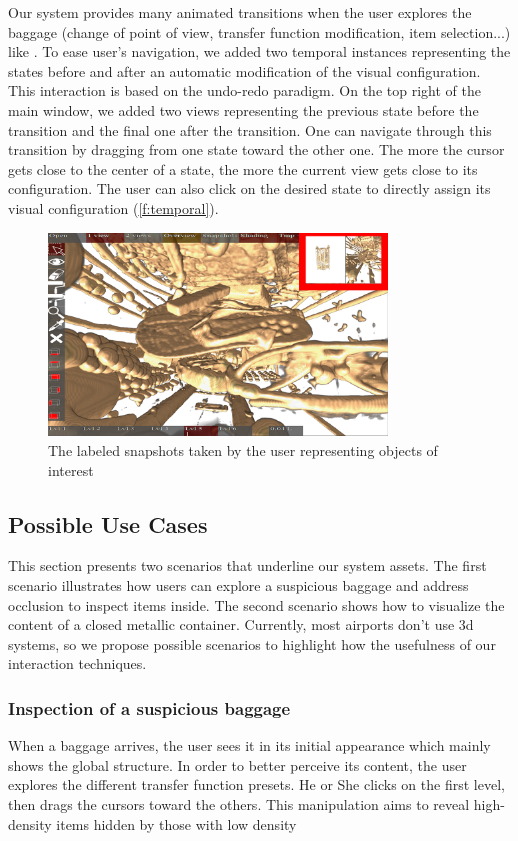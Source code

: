Our system provides many animated transitions when the user explores the baggage (change of point of view, transfer function modification, item selection...) like \cite{tversky_animation:_2002}. To ease user's navigation, we added two temporal instances representing the states before and after an automatic modification of the visual configuration. This interaction is based on the undo-redo paradigm. On the top right of the main window, we added two views representing the previous state before the transition and the final one after the transition. One can navigate through this transition by dragging from one state toward the other one. The more the cursor gets close to the center of a state, the more the current view gets close to its configuration. The user can also click on the desired state to directly assign its visual configuration (\autoref{f:temporal}).
 \begin{figure}
 \centering
	\includegraphics[width=9cm]{Figures/temporal.png}
	\caption{ The labeled snapshots taken by the user representing objects of interest}
	\label{f:temporal}
\end{figure}

\subsection{Possible Use Cases}

This section presents two scenarios that underline our system assets. The first scenario illustrates how users can explore a suspicious baggage and address occlusion to inspect items inside. The second scenario shows how to visualize the content of a closed metallic container. Currently, most airports don't use 3d systems, so we propose possible scenarios to highlight how the usefulness of our interaction techniques.

\subsubsection{	Inspection of a suspicious baggage }
When a baggage arrives, the user sees it in its initial appearance which mainly shows the global structure. In order to better perceive its content, the user explores the different transfer function presets. He or She clicks on the first level, then drags the cursors toward the others. This manipulation aims to reveal high-density items hidden by those with low density 

